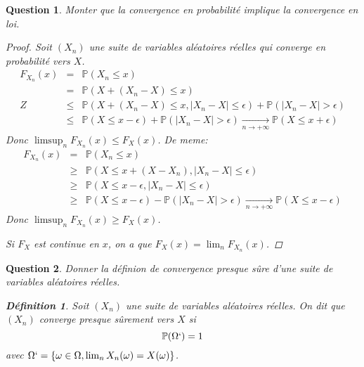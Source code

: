 \documentclass{article}
\theoremstyle{plain}
\newtheorem{question}{Question}
\theoremstyle{definition}
\newtheorem{definition}{Définition}
\begin{document}
\begin{question}
	Monter que la convergence en probabilité implique la convergence en loi.
	\begin{proof}
		Soit $(X_n)$ une suite de variables aléatoires réelles qui converge en probabilité vers $X$.
		\begin{eqnarray*}
			F_{X_n} (x) &=& \mathbb{P} (X_n \leq x) \\
			&=& \mathbb{P} (X + (X_n - X) \leq x) \\Z
			&\leq& \mathbb{P} (X+(X_n-X) \leq x, |X_n - X| \leq \epsilon) + \mathbb{P} (|X_n - X| > \epsilon) \\
			&\leq& \mathbb{P} (X \leq x - \epsilon) + \mathbb{P} (|X_n - X| > \epsilon) \underset{n\to +\infty}{\longrightarrow} \mathbb{P}(X \leq x + \epsilon)
		\end{eqnarray*}
		Donc $\limsup_n F_{X_n} (x) \leq F_X(x)$.
		De meme:
		\begin{eqnarray*}
			F_{X_n} (x) &=& \mathbb{P} (X_n \leq x) \\
			&\geq& \mathbb{P} (X \leq x + (X-X_n), |X_n - X| \leq \epsilon) \\
			&\geq& \mathbb{P} (X \leq x - \epsilon, |X_n - X| \leq \epsilon) \\
			&\geq& \mathbb{P} (X \leq x - \epsilon) - \mathbb{P} (|X_n - X| > \epsilon)  \underset{n\to +\infty}{\longrightarrow} \mathbb{P}(X \leq x - \epsilon)
		\end{eqnarray*}
		Donc $\limsup_n F_{X_n} (x) \geq F_X(x)$.

		Si $F_X$ est continue en $x$, on a que $F_X(x) = \lim_n F_{X_n} (x)$.
	\end{proof}
\end{question}

\begin{question}
	Donner la définion de convergence presque sûre d'une suite de variables aléatoires réelles.
	\begin{definition}
		Soit $(X_n)$ une suite de variables aléatoires réelles. On dit que $(X_n)$ converge presque sûrement vers $X$ si
		\begin{equation*}
			\mathbb{P} (\Omega`) = 1
		\end{equation*}
		avec $\Omega` = \{\omega \in \Omega, \lim_n X_n (\omega) = X(\omega)\}$.
	\end{definition}
\end{question}
\end{document}
